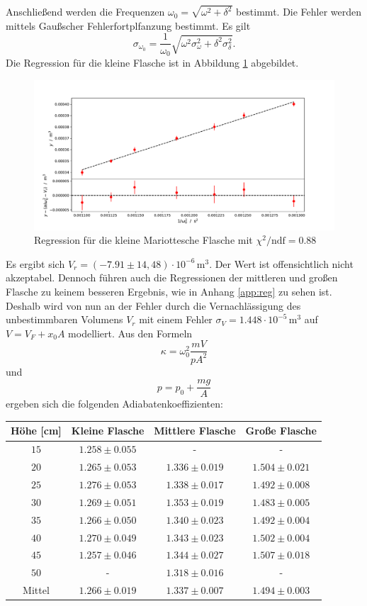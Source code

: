 \documentclass[a4paper, 12pt]{scrartcl}
\begin{document}
Anschließend werden die Frequenzen $\omega_0 = \sqrt{\omega^2 + \delta^2}$ bestimmt. Die Fehler werden mittels Gaußscher Fehlerfortplfanzung bestimmt. Es gilt
$$\sigma_{\omega_0} = \frac 1{\omega_0} \sqrt{\omega^2\sigma_{\omega}^2 + \delta^2\sigma_{\delta}^2}.$$
Die Regression für die kleine Flasche ist in Abbildung \ref{plt:reg_kle} abgebildet.
\begin{figure}[H]
\centering
\includegraphics[width=\textwidth]{plots/regression_kleine.pdf}
\caption{Regression für die kleine Mariottesche Flasche mit $\chi^2/\text{ndf} = 0.88$}
\label{plt:reg_kle}
\end{figure}
Es ergibt sich $V_r = (-7.91 \pm 14,48) \cdot 10^{-6}\,\text{m}^3$. Der Wert ist offensichtlich nicht akzeptabel. Dennoch führen auch die Regressionen der mittleren und großen Flasche zu keinem besseren Ergebnis, wie in Anhang \ref{app:reg} zu sehen ist. Deshalb wird von nun an der Fehler durch die Vernachlässigung des unbestimmbaren Volumens $V_r$ mit einem Fehler $\sigma_V = 1.448 \cdot 10^{-5}\,\text{m}^3$ auf $V = V_{F} + x_0A$ modelliert.
Aus den Formeln
\begin{equation*}
\kappa = \omega_0^2 \frac{mV}{pA^2}
\end{equation*}
und 
\begin{equation*}
p = p_0 + \frac{mg}{A}
\end{equation*}
ergeben sich die folgenden Adiabatenkoeffizienten:
\begin{table}[H]
\centering
\begin{tabular}{c|ccc}
Höhe [cm] & Kleine Flasche & Mittlere Flasche & Große Flasche \\
\hline
$15$ & $1.258\pm 0.055$ & - & - \\
$20$ & $1.265\pm 0.053$ & $1.336\pm 0.019$ & $1.504\pm 0.021$ \\
$25$ & $1.276\pm 0.053$ & $1.338\pm 0.017$ & $1.492\pm 0.008$ \\
$30$ & $1.269\pm 0.051$ & $1.353\pm 0.019$ & $1.483\pm 0.005$ \\
$35$ & $1.266\pm 0.050$ & $1.340\pm 0.023$ & $1.492\pm 0.004$ \\
$40$ & $1.270\pm 0.049$ & $1.343\pm 0.023$ & $1.502\pm 0.004$ \\
$45$ & $1.257\pm 0.046$ & $1.344\pm 0.027$ & $1.507\pm 0.018$ \\
$50$ & - & $1.318\pm 0.016$ & - \\
\hline
Mittel & $1.266\pm 0.019$ & $1.337\pm 0.007$ & $1.494\pm 0.003$
\end{tabular}
\end{table}	
\end{document}
